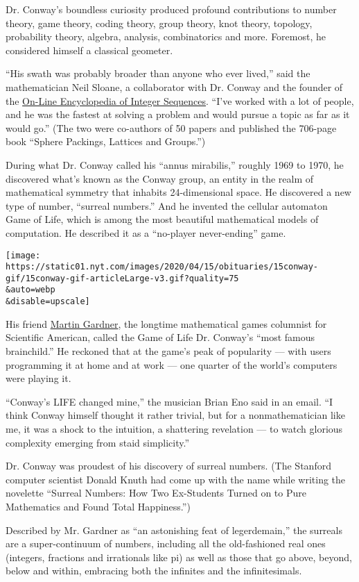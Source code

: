 Dr. Conway's boundless curiosity produced profound contributions to
number theory, game theory, coding theory, group theory, knot theory,
topology, probability theory, algebra, analysis, combinatorics and more.
Foremost, he considered himself a classical geometer.

``His swath was probably broader than anyone who ever lived,'' said the
mathematician Neil Sloane, a collaborator with Dr. Conway and the
founder of the \href{https://oeis.org/}{On-Line Encyclopedia of Integer
Sequences}. ``I've worked with a lot of people, and he was the fastest
at solving a problem and would pursue a topic as far as it would go.''
(The two were co-authors of 50 papers and published the 706-page book
``Sphere Packings, Lattices and Groups.'')

During what Dr. Conway called his ``annus mirabilis,'' roughly 1969 to
1970, he discovered what's known as the Conway group, an entity in the
realm of mathematical symmetry that inhabits 24-dimensional space. He
discovered a new type of number, ``surreal numbers.'' And he invented
the cellular automaton Game of Life, which is among the most beautiful
mathematical models of computation. He described it as a ``no-player
never-ending'' game.

\texttt{[image: https://static01.nyt.com/images/2020/04/15/obituaries/15conway-gif/15conway-gif-articleLarge-v3.gif?quality=75\\\&auto=webp\\\&disable=upscale]}

His friend
\href{https://www.nytimes.com/2010/05/24/us/24gardner.html}{Martin
Gardner}, the longtime mathematical games columnist for Scientific
American, called the Game of Life Dr. Conway's ``most famous
brainchild.'' He reckoned that at the game's peak of popularity --- with
users programming it at home and at work --- one quarter of the world's
computers were playing it.

``Conway's LIFE changed mine,'' the musician Brian Eno said in an email.
``I think Conway himself thought it rather trivial, but for a
nonmathematician like me, it was a shock to the intuition, a shattering
revelation --- to watch glorious complexity emerging from staid
simplicity.''

Dr. Conway was proudest of his discovery of surreal numbers. (The
Stanford computer scientist Donald Knuth had come up with the name while
writing the novelette ``Surreal Numbers: How Two Ex-Students Turned on
to Pure Mathematics and Found Total Happiness.'')

Described by Mr. Gardner as ``an astonishing feat of legerdemain,'' the
surreals are a super-continuum of numbers, including all the
old-fashioned real ones (integers, fractions and irrationals like pi) as
well as those that go above, beyond, below and within, embracing both
the infinites and the infinitesimals.

